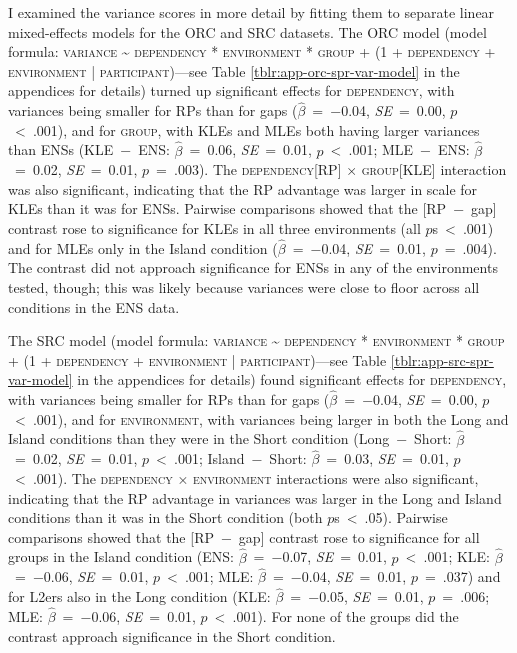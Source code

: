 I examined the variance scores in more detail by fitting them to separate linear mixed-effects models for the ORC and SRC datasets. The ORC model (model formula: \textsc{variance \~{} dependency * environment * group + (1 + dependency + environment | participant)}---see Table \ref{tblr:app-orc-spr-var-model} in the appendices for details) turned up significant effects for \textsc{dependency}, with variances being smaller for RPs than for gaps ($\hat{\beta}$~=~−0.04, \textit{SE}~=~0.00, $p$~<~.001), and for \textsc{group}, with KLEs and MLEs both having larger variances than ENSs (KLE~−~ENS: $\hat{\beta}$~=~0.06, \textit{SE}~=~0.01, $p$~<~.001; MLE~−~ENS: $\hat{\beta}$~=~0.02, \textit{SE}~=~0.01, $p$~=~.003). The \textsc{dependency}[RP] × \textsc{group}[KLE] interaction was also significant, indicating that the RP advantage was larger in scale for KLEs than it was for ENSs. Pairwise comparisons showed that the [RP~−~gap] contrast rose to significance for KLEs in all three environments (all $p$s~<~.001) and for MLEs only in the Island condition ($\hat{\beta}$~=~−0.04, \textit{SE}~=~0.01, $p$~=~.004). The contrast did not approach significance for ENSs in any of the environments tested, though; this was likely because variances were close to floor across all conditions in the ENS data.

The SRC model (model formula: \textsc{variance \~{} dependency * environment * group + (1 + dependency + environment | participant)}---see Table \ref{tblr:app-src-spr-var-model} in the appendices for details) found significant effects for \textsc{dependency}, with variances being smaller for RPs than for gaps ($\hat{\beta}$~=~−0.04, \textit{SE}~=~0.00, $p$~<~.001), and for \textsc{environment}, with variances being larger in both the Long and Island conditions than they were in the Short condition (Long~−~Short: $\hat{\beta}$~=~0.02, \textit{SE}~=~0.01, $p$~<~.001; Island~−~Short: $\hat{\beta}$~=~0.03, \textit{SE}~=~0.01, $p$~<~.001). The \textsc{dependency} × \textsc{environment} interactions were also significant, indicating that the RP advantage in variances was larger in the Long and Island conditions than it was in the Short condition (both $p$s~<~.05). Pairwise comparisons showed that the [RP~−~gap] contrast rose to significance for all groups in the Island condition (ENS: $\hat{\beta}$~=~−0.07, \textit{SE}~=~0.01, $p$~<~.001; KLE: $\hat{\beta}$~=~−0.06, \textit{SE}~=~0.01, $p$~<~.001; MLE: $\hat{\beta}$~=~−0.04, \textit{SE}~=~0.01, $p$~=~.037) and for L2ers also in the Long condition (KLE: $\hat{\beta}$~=~−0.05, \textit{SE}~=~0.01, $p$~=~.006; MLE: $\hat{\beta}$~=~−0.06, \textit{SE}~=~0.01, $p$~<~.001). For none of the groups did the contrast approach significance in the Short condition.

